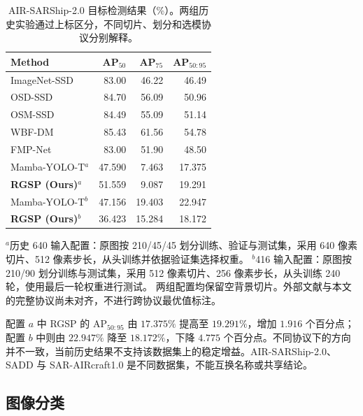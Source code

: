 \documentclass[journal]{IEEEtran}
\begin{document}
\begin{table}[!t]
\centering
\small
\setlength{\tabcolsep}{5pt}
\caption{AIR-SARShip-2.0 目标检测结果（\%）。两组历史实验通过上标区分，不同切片、划分和选模协议分别解释。}
\label{tab:air_sarship_comparison}
\begin{tabular*}{\textwidth}{@{\extracolsep{\fill}}lrrr}
\toprule
Method & AP$_{50}$ & AP$_{75}$ & AP$_{50:95}$ \\
\midrule
ImageNet-SSD & 83.00 & 46.22 & 46.49 \\
OSD-SSD      & 84.70 & 56.09 & 50.96 \\
OSM-SSD      & 84.49 & 55.09 & 51.14 \\
WBF-DM       & 85.43 & 61.56 & 54.78 \\
FMP-Net      & 83.00 & 51.90 & 48.50 \\
\midrule
Mamba-YOLO-T$^{a}$
             & 47.590 & 7.463 & 17.375 \\
\textbf{RGSP (Ours)}$^{a}$
             & 51.559 & 9.087 & 19.291 \\
Mamba-YOLO-T$^{b}$
             & 47.156 & 19.403 & 22.947 \\
\textbf{RGSP (Ours)}$^{b}$
             & 36.423 & 15.284 & 18.172 \\
\bottomrule
\end{tabular*}
\smallskip
\begin{minipage}{\linewidth}
\footnotesize
$^{a}$历史 640 输入配置：原图按 210/45/45 划分训练、验证与测试集，采用 640 像素切片、512 像素步长，从头训练并依据验证集选择权重。
$^{b}$416 输入配置：原图按 210/90 划分训练与测试集，采用 512 像素切片、256 像素步长，从头训练 240 轮，使用最后一轮权重进行测试。
两组配置均保留空背景切片。外部文献与本文的完整协议尚未对齐，不进行跨协议最优值标注。
\end{minipage}
\end{table}

配置 $a$ 中 RGSP 的 $\mathrm{AP}_{50:95}$ 由 $17.375\%$ 提高至 $19.291\%$，增加 $1.916$ 个百分点；配置 $b$ 中则由 $22.947\%$ 降至 $18.172\%$，下降 $4.775$ 个百分点。不同协议下的方向并不一致，当前历史结果不支持该数据集上的稳定增益。AIR-SARShip-2.0、SADD 与 SAR-AIRcraft1.0 是不同数据集，不能互换名称或共享结论。

\FloatBarrier


\subsection{图像分类}
\label{sec:classification_results}
\end{document}
